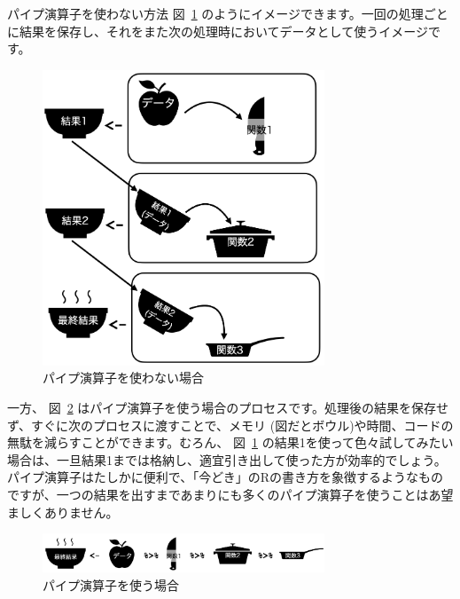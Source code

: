 \documentclass[
  a4paper,
  pandoc,
  ja=standard,
  jafont=haranoaji]{bxjsbook}
\begin{document}
パイプ演算子を使わない方法 図~\ref{fig-handling1_pipe1}
のようにイメージできます。一回の処理ごとに結果を保存し、それをまた次の処理時においてデータとして使うイメージです。

\begin{figure}

{\centering \includegraphics[width=0.75\textwidth,height=\textheight]{./Figs/Handling1/Pipeline1.png}

}

\caption{\label{fig-handling1_pipe1}パイプ演算子を使わない場合}

\end{figure}

一方、 図~\ref{fig-handling1_pipe2}
はパイプ演算子を使う場合のプロセスです。処理後の結果を保存せず、すぐに次のプロセスに渡すことで、メモリ
(図だとボウル)や時間、コードの無駄を減らすことができます。むろん、
図~\ref{fig-handling1_pipe1}
の結果1を使って色々試してみたい場合は、一旦結果1までは格納し、適宜引き出して使った方が効率的でしょう。パイプ演算子はたしかに便利で、「今どき」のRの書き方を象徴するようなものですが、一つの結果を出すまであまりにも多くのパイプ演算子を使うことはあ望ましくありません。

\begin{figure}

{\centering \includegraphics[width=0.75\textwidth,height=\textheight]{./Figs/Handling1/Pipeline2.png}

}

\caption{\label{fig-handling1_pipe2}パイプ演算子を使う場合}

\end{figure}
\end{document}
